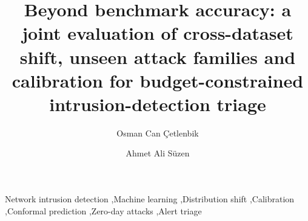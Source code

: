 \documentclass[preprint,12pt,authoryear=false]{elsarticle}
\begin{document}
\begin{frontmatter}

\title{Beyond benchmark accuracy: a joint evaluation of cross-dataset shift, unseen attack families and calibration for budget-constrained intrusion-detection triage}

\author[aff1]{Osman Can Çetlenbik}
\author[aff2]{Ahmet Ali Süzen}



\begin{keyword}
Network intrusion detection \sep Machine learning \sep Distribution shift \sep Calibration \sep Conformal prediction \sep Zero-day attacks \sep Alert triage
\end{keyword}

\end{frontmatter}











\end{document}
